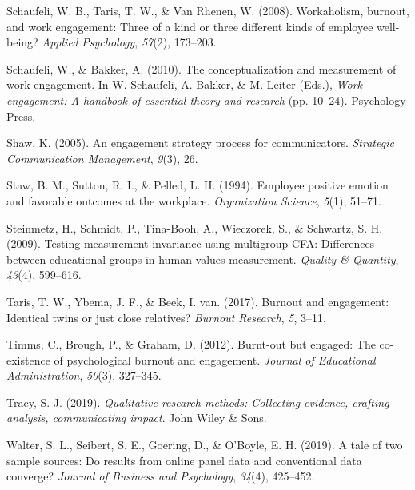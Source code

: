 \documentclass[
  man]{apa7}
\newlength{\cslhangindent}
\newlength{\cslentryspacingunit} %
\newenvironment{CSLReferences}[2] %
 {%
  \setlength{\parindent}{0pt}
  \ifodd #1
  \let\oldpar\par
  \def\par{\hangindent=\cslhangindent\oldpar}
  \fi
  \setlength{\parskip}{#2\cslentryspacingunit}
 }%
 {}
\begin{document}
\begin{CSLReferences}{1}{0}
\leavevmode{}%
Schaufeli, W. B., Taris, T. W., \& Van Rhenen, W. (2008). Workaholism, burnout, and work engagement: Three of a kind or three different kinds of employee well-being? \emph{Applied Psychology}, \emph{57}(2), 173--203.

\leavevmode{}%
Schaufeli, W., \& Bakker, A. (2010). The conceptualization and measurement of work engagement. In W. Schaufeli, A. Bakker, \& M. Leiter (Eds.), \emph{Work engagement: A handbook of essential theory and research} (pp. 10--24). Psychology Press.

\leavevmode{}%
Shaw, K. (2005). An engagement strategy process for communicators. \emph{Strategic Communication Management}, \emph{9}(3), 26.

\leavevmode{}%
Staw, B. M., Sutton, R. I., \& Pelled, L. H. (1994). Employee positive emotion and favorable outcomes at the workplace. \emph{Organization Science}, \emph{5}(1), 51--71.

\leavevmode{}%
Steinmetz, H., Schmidt, P., Tina-Booh, A., Wieczorek, S., \& Schwartz, S. H. (2009). Testing measurement invariance using multigroup CFA: Differences between educational groups in human values measurement. \emph{Quality \& Quantity}, \emph{43}(4), 599--616.

\leavevmode{}%
Taris, T. W., Ybema, J. F., \& Beek, I. van. (2017). Burnout and engagement: Identical twins or just close relatives? \emph{Burnout Research}, \emph{5}, 3--11.

\leavevmode{}%
Timms, C., Brough, P., \& Graham, D. (2012). Burnt-out but engaged: The co-existence of psychological burnout and engagement. \emph{Journal of Educational Administration}, \emph{50}(3), 327--345.

\leavevmode{}%
Tracy, S. J. (2019). \emph{Qualitative research methods: Collecting evidence, crafting analysis, communicating impact}. John Wiley \& Sons.

\leavevmode{}%
Walter, S. L., Seibert, S. E., Goering, D., \& O'Boyle, E. H. (2019). A tale of two sample sources: Do results from online panel data and conventional data converge? \emph{Journal of Business and Psychology}, \emph{34}(4), 425--452.

\end{CSLReferences}

\endgroup
\end{document}
